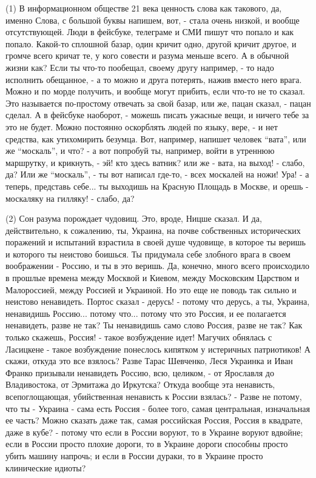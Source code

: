 (1) В информационном обществе 21 века ценность слова как такового, да, именно
Слова, с большой буквы напишем, вот, - стала очень низкой, и вообще
отсутствующей. Люди в фейсбуке, телеграме и СМИ пишут что попало и как попало.
Какой-то сплошной базар, один кричит одно, другой кричит другое, и громче всего
кричат те, у кого совести и разума меньше всего.  А в обычной жизни как? Если
ты что-то пообещал, своему другу например, - то надо исполнить обещанное, - а
то можно и друга потерять, нажив вместо него врага. Можно и по морде получить,
и вообще могут прибить, если что-то не то сказал. Это называется по-простому
отвечать за свой базар, или же, пацан сказал, - пацан сделал. А в фейсбуке
наоборот, - можешь писать ужасные вещи, и ничего тебе за это не будет. Можно
постоянно оскорблять людей по языку, вере, - и нет средства, как утихомирить
безумца. Вот, например, напишет человек \enquote{вата}, или же
\enquote{москаль}, и что? - а вот попробуй ты, например, войти в утреннюю
маршрутку, и крикнуть, - эй! кто здесь ватник?  или же - вата, на выход! -
слабо, да? Или же \enquote{москаль}, - ты вот написал где-то, - всех москалей
на ножи! Ура! - а теперь, представь себе... ты выходишь на Красную Площадь в
Москве, и орешь - москаляку на гилляку! - слабо, да?

(2) Сон разума порождает чудовищ. Это, вроде, Ницше сказал. И да,
действительно, к сожалению, ты, Украина, на почве собственных исторических
поражений и испытаний взрастила в своей душе чудовище, в которое ты веришь и
которого ты неистово боишься. Ты придумала себе злобного врага в своем
воображении - Россию, и ты в это веришь. Да, конечно, много всего происходило в
прошлые времена между Москвой и Киевом, между Московским Царством и
Малороссией, между Россией и Украиной.  Но это еще не поводь так сильно и
неистово ненавидеть. Портос сказал - дерусь! - потому что дерусь, а ты,
Украина, ненавидишь Россию... потому что... потому что это Россия, и ее
полагается ненавидеть, разве не так? Ты ненавидишь само слово Россия, разве не
так? Как только скажешь, Россия! - такое возбуждение идет! Магучих обнялась с
Ласицкене - такое возбуждение понеслось кипятком у истеричных патриотиков! А
скажи, откуда это все взялось? Разве Тарас Шевченко, Леся Украинка и Иван
Франко призывали ненавидеть Россию, всю, целиком, - от Ярославля до
Владивостока, от Эрмитажа до Иркутска? Откуда вообще эта ненависть,
всепоглощающая, убийственная ненависть к России взялась? - Разве не потому, что
ты - Украина - сама есть Россия - более того, самая центральная, изначальная ее
часть? Можно сказать даже так, самая российская Россия, Россия в квадрате, даже
в кубе? - потому что если в России воруют, то в Украине воруют вдвойне; если в
России просто плохие дороги, то в Украине дороги способны просто убить машину
напрочь; и если в России дураки, то в Украине просто клинические идиоты?
